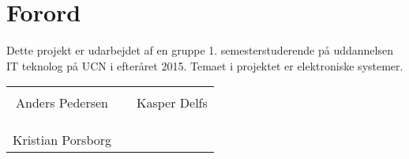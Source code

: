 \chapter*{Forord}

Dette projekt er udarbejdet af en gruppe 1. semesterstuderende på uddannelsen
IT teknolog på UCN i efteråret 2015. Temaet i projektet er elektroniske systemer.





%
\phantom{Luft}\vspace{3cm}
\begin{table}[H]
	\centering
		\begin{tabular}{c c c}
			\underline{\phantom{JAERJAERJAERJAERGO}} & \phantom{cookies} & \underline{\phantom{JAERJAERJAERJAERGO}} \\
			Anders Pedersen			& \phantom{cookies} & Kasper Delfs		\\
			&&\\
			&&\\
			 \underline{\phantom{JAERJAERJAERJAERGO}} \\
			Kristian Porsborg			
			&&\\
					
		\end{tabular}
\end{table}